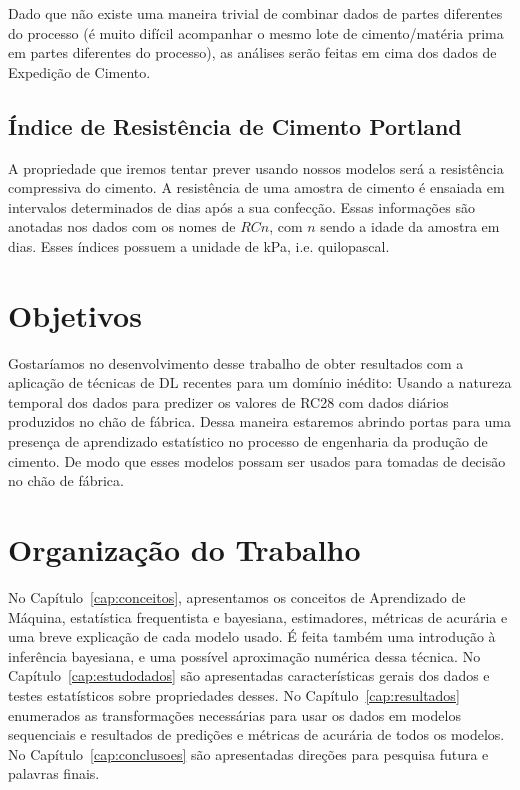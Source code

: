 Dado que não existe uma maneira trivial de combinar dados de partes diferentes do processo (é muito difícil acompanhar o mesmo lote de cimento/matéria prima em partes diferentes do processo), as análises serão feitas em cima dos dados de Expedição de Cimento.

\subsection{Índice de Resistência de Cimento Portland}
\label{sec:rc}
A propriedade que iremos tentar prever usando nossos modelos será a resistência
compressiva do cimento. A resistência de uma amostra de cimento é ensaiada em
intervalos determinados de dias após a sua confecção. Essas informações são
anotadas nos dados com os nomes de $RCn$, com $n$ sendo a idade da amostra em
dias. Esses índices possuem a unidade de kPa, i.e. quilopascal.

\section{Objetivos}
\label{sec:objetivo}

Gostaríamos no desenvolvimento desse trabalho de obter resultados com a
aplicação de técnicas de DL recentes para um domínio inédito: Usando a
natureza temporal dos dados para predizer os valores de RC28 com dados diários
produzidos no chão de fábrica. Dessa maneira
estaremos abrindo portas para uma presença de aprendizado estatístico no processo de
engenharia da produção de cimento. De modo que esses modelos possam ser usados para tomadas de decisão no chão de fábrica.


\section{Organização do Trabalho}
\label{sec:organizacao_trabalho}

No Capítulo~\ref{cap:conceitos}, apresentamos os conceitos de Aprendizado de
Máquina, estatística frequentista e bayesiana, estimadores, métricas de acurária
e uma breve explicação de cada modelo usado. É feita também uma introdução à inferência
bayesiana, e uma possível aproximação numérica dessa técnica. No
Capítulo~\ref{cap:estudodados} são apresentadas características gerais dos
dados e testes estatísticos sobre propriedades desses. No
Capítulo~\ref{cap:resultados} enumerados as transformações necessárias para usar
os dados em modelos sequenciais e resultados de predições e métricas de
acurária de todos os modelos. No Capítulo~\ref{cap:conclusoes} são apresentadas
direções para pesquisa futura e palavras finais. 



